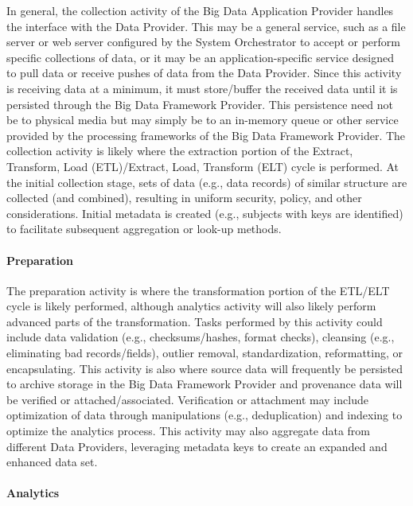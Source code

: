 \documentclass[10pt]{article}
\begin{document}
In general, the collection activity of the Big Data Application Provider handles the interface with the Data Provider. This may be a general service, such as a file server or web server configured by the System Orchestrator to accept or perform specific collections of data, or it may be an application-specific service designed to pull data or receive pushes of data from the Data Provider. Since this activity is receiving data at a minimum, it must store/buffer the received data until it is persisted through the Big Data Framework Provider. This persistence need not be to physical media but may simply be to an in-memory queue or other service provided by the processing frameworks of the Big Data Framework Provider. The collection activity is likely where the extraction portion of the Extract, Transform, Load (ETL)/Extract, Load, Transform (ELT) cycle is performed. At the initial collection stage, sets of data (e.g., data records) of similar structure are collected (and combined), resulting in uniform security, policy, and other considerations. Initial metadata is created (e.g., subjects with keys are identified) to facilitate subsequent aggregation or look-up methods.

\paragraph{Preparation}

The preparation activity is where the transformation portion of the ETL/ELT cycle is likely performed, although analytics activity will also likely perform advanced parts of the transformation. Tasks performed by this activity could include data validation (e.g., checksums/hashes, format checks), cleansing (e.g., eliminating bad records/fields), outlier removal, standardization, reformatting, or encapsulating. This activity is also where source data will frequently be persisted to archive storage in the Big Data Framework Provider and provenance data will be verified or attached/associated. Verification or attachment may include optimization of data through manipulations (e.g., deduplication) and indexing to optimize the analytics process. This activity may also aggregate data from different Data Providers, leveraging metadata keys to create an expanded and enhanced data set.

\paragraph{Analytics}
\end{document}
